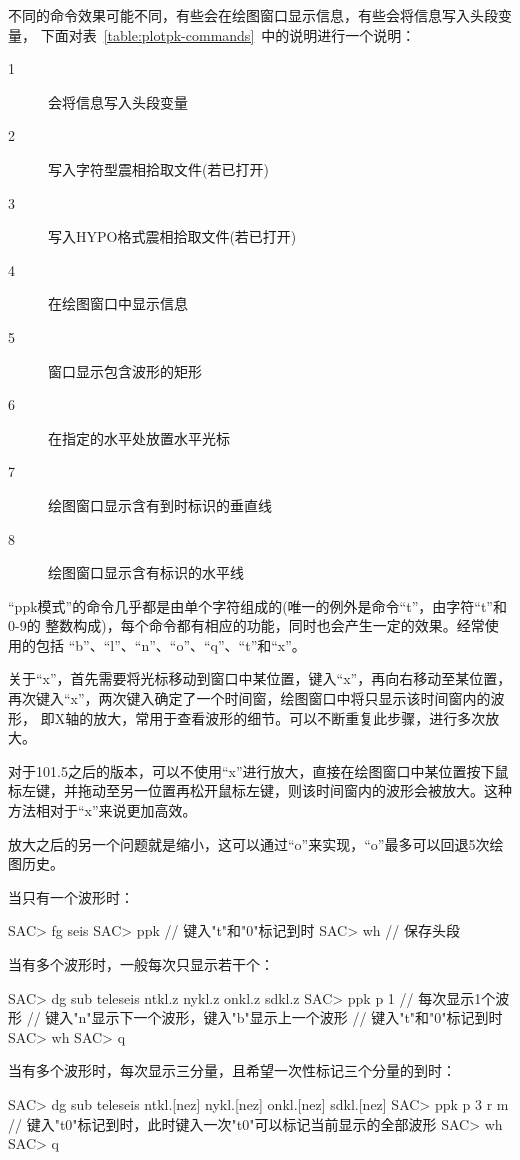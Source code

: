 不同的命令效果可能不同，有些会在绘图窗口显示信息，有些会将信息写入头段变量，
下面对表~\ref{table:plotpk-commands}~中的说明进行一个说明：
\begin{description}
    \item [1] 会将信息写入头段变量
    \item [2] 写入字符型震相拾取文件(若已打开)
    \item [3] 写入HYPO格式震相拾取文件(若已打开)
    \item [4] 在绘图窗口中显示信息
    \item [5] 窗口显示包含波形的矩形
    \item [6] 在指定的水平处放置水平光标
    \item [7] 绘图窗口显示含有到时标识的垂直线
    \item [8] 绘图窗口显示含有标识的水平线
\end{description}

``ppk模式''的命令几乎都是由单个字符组成的(唯一的例外是命令``t''，由字符``t''和0-9的
整数构成)，每个命令都有相应的功能，同时也会产生一定的效果。经常使用的包括
``b''、``l''、``n''、``o''、``q''、``t''和``x''。

关于``x''，首先需要将光标移动到窗口中某位置，键入``x''，再向右移动至某位置，
再次键入``x''，两次键入确定了一个时间窗，绘图窗口中将只显示该时间窗内的波形，
即X轴的放大，常用于查看波形的细节。可以不断重复此步骤，进行多次放大。

对于101.5之后的版本，可以不使用``x''进行放大，直接在绘图窗口中某位置按下鼠标左键，并拖动至另一位置再松开鼠标左键，则该时间窗内的波形会被放大。这种方法相对于``x''来说更加高效。

放大之后的另一个问题就是缩小，这可以通过``o''来实现，``o''最多可以回退5次绘图历史。

当只有一个波形时：
\begin{SACCode}
SAC> fg seis
SAC> ppk
// 键入"t"和"0"标记到时
SAC> wh         // 保存头段
\end{SACCode}

当有多个波形时，一般每次只显示若干个：
\begin{SACCode}
SAC> dg sub teleseis ntkl.z nykl.z onkl.z sdkl.z
SAC> ppk p 1    // 每次显示1个波形
// 键入"n"显示下一个波形，键入"b"显示上一个波形
// 键入"t"和"0"标记到时
SAC> wh
SAC> q
\end{SACCode}

当有多个波形时，每次显示三分量，且希望一次性标记三个分量的到时：
\begin{SACCode}
SAC> dg sub teleseis ntkl.[nez] nykl.[nez] onkl.[nez] sdkl.[nez]
SAC> ppk p 3 r m
// 键入"t0"标记到时，此时键入一次"t0"可以标记当前显示的全部波形
SAC> wh
SAC> q
\end{SACCode}
